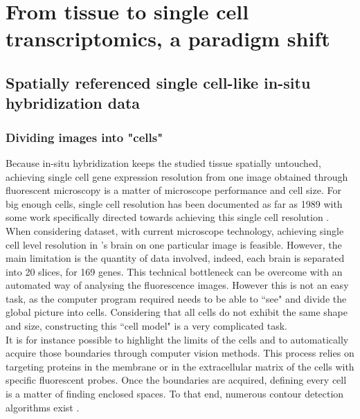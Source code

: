 \chapter{From tissue to single cell transcriptomics, a paradigm shift}\label{ch:singlecell}
\section{Spatially referenced single cell-like in-situ hybridization data}\label{sec:single_cell_insitu}
  \subsection{Dividing images into "cells"}
  Because in-situ hybridization keeps the studied tissue spatially untouched, achieving single cell gene expression resolution from one image obtained through fluorescent microscopy is a matter of microscope performance and cell size. For big enough cells, single cell resolution has been documented as far as 1989 \cite{tautz89} with some work specifically directed towards achieving this single cell resolution \cite{poulsen93}.\\
  
  When considering \cite{Tomer10} dataset, with current microscope technology, achieving single cell level resolution in \platy{}'s brain on one particular image is feasible. However, the main limitation is the quantity of data involved, indeed, each brain is separated into 20 slices, for 169 genes. This technical bottleneck can be overcome with an automated way of analysing the fluorescence images. However this is not an easy task, as the computer program required needs to be able to ``see" and divide the global picture into cells. Considering that all cells do not exhibit the same shape and size, constructing this ``cell model" is a very complicated task.\\
  
  It is for instance possible to highlight the limits of the cells and to automatically acquire those boundaries through computer vision methods. This process relies on targeting proteins in the membrane or in the extracellular matrix of the cells with specific fluorescent probes. Once the boundaries are acquired, defining every cell is a matter of finding enclosed spaces. To that end, numerous contour detection algorithms exist \cite{li95,fan01,arbelaez11}.\\
  
